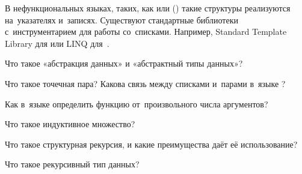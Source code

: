 В нефункциональных языках, таких, как  или  () такие структуры реализуются на~указателях и~записях. Существуют стандартные библиотеки с~инструментарием для работы со~списками. Например, Standard Template Library для  или LINQ для~.

\begin{Queeze}

 \item Что такое «абстракция данных» и «абстрактный типы данных»?

 \item Что такое точечная пара? Какова связь между списками и~парами в~языке \Scheme?

 \item Как в~языке \Scheme определить функцию от~произвольного числа аргументов?

 \item Что такое индуктивное множество?

 \item Что такое структурная рекурсия, и какие преимущества даёт её использование?
 
 \item Что такое рекурсивный тип данных?

\end{Queeze}
\endinput